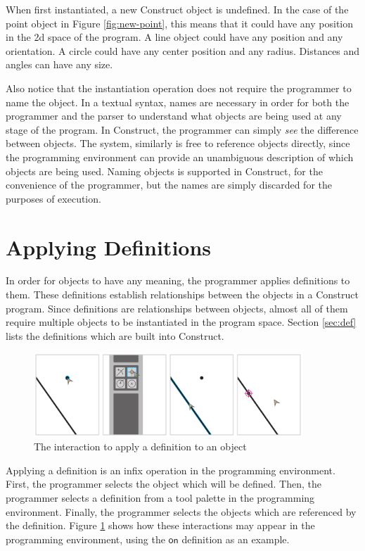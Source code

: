 \documentclass[twoside,openright,11pt]{report}
\begin{document}
When first instantiated, a new Construct object is undefined. 
In the case of the point object in Figure \ref{fig:new-point}, this means that it could have any position in the 2d space of the program. 
A line object could have any position and any orientation.
A circle could have any center position and any radius. 
Distances and angles can have any size.

Also notice that the instantiation operation does not require the programmer to name the object. 
In a textual syntax, names are necessary in order for both the programmer and the parser to understand what objects are being used at any stage of the program.
In Construct, the programmer can simply {\it see} the difference between objects.
The system, similarly is free to reference objects directly, since the programming environment can provide an unambiguous description of which objects are being used.
Naming objects is supported in Construct, for the convenience of the programmer, but the names are simply discarded for the purposes of execution.

\section{Applying Definitions}
\label{sec:applydef}

In order for objects to have any meaning, the programmer applies definitions to them. 
These definitions establish relationships between the objects in a Construct program. 
Since definitions are relationships between objects, almost all of them require multiple objects to be instantiated in the program space. 
Section \ref{sec:def} lists the definitions which are built into Construct.

\begin{figure}[h]
  \centering
  \includegraphics[width=0.9\textwidth]{definition.pdf}
  \caption{The interaction to apply a definition to an object}
  \label{fig:def-interaction}
\end{figure}

Applying a definition is an infix operation in the programming environment. 
First, the programmer selects the object which will be defined. 
Then, the programmer selects a definition from a tool palette in the programming environment. 
Finally, the programmer selects the objects which are referenced by the definition.
Figure \ref{fig:def-interaction} shows how these interactions may appear in the programming environment, using the $\mathsf{on}$ definition as an example.
\end{document}
